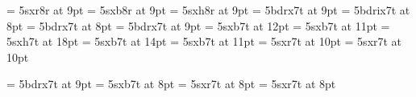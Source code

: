 \usepackage{struktur,bodoni}
\font\rawrm     = 5sxr8r at 9pt
\font\rawbf     = 5sxb8r at 9pt
\font\rawhv     = 5sxh8r at 9pt
\font\ixpt      = 5bdrx7t at 9pt
\font\confname  = 5bdrix7t at 8pt
\font\crnotice  = 5bdrx7t at 8pt
\font\ninept    = 5bdrx7t at 9pt
\font\secfnt    = 5sxb7t at 12pt
\font\subsecfnt = 5sxb7t at 11pt
\font\ttlfnt    = 5sxh7t at 18pt
\font\subttlfnt = 5sxb7t at 14pt
\font\aufnt     = 5sxb7t at 11pt
\font\affaddr   = 5sxr7t at 10pt
\font\eaddfnt   = 5sxr7t at 10pt

\font\CMfont = 5bdrx7t at 9pt
\font\KWfont = 5sxb7t at 8pt
\font\VRfont = 5sxr7t at 8pt
\font\BGfont = 5sxr7t at 8pt

\def\labelitemi{\textbullet}
\def\la{{\rawrm\char'074}}
\def\ra{{\rawrm\char'076}}
\def\cd#1{{\BGfont#1}}
\def\id#1{\texttt{#1}}
\def\to{\ensuremath\rightarrow}


\def\Mop#1{{\color{blue}{#1}}}
\def\Mbegincode{\Mop{\rawhv.\la}\thinspace}
\def\Mendcode{\thinspace\Mop{\ra\rawhv.}}
\def\Msplice{\Mop{\rawhv.\char'176}}
\def\Mtilde{\Mop{\char'176}}

\def\Msp#1{{\color{green}{#1}}}
\def\Mquote#1{\Msp{\rawhv\char'074{\rawbf?}#1}\thinspace}
\def\Munquote{\thinspace\Msp{{\rawbf?}{\rawhv\char'076}}}

